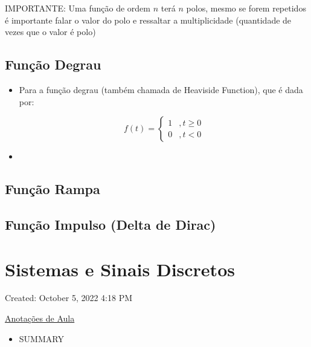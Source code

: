 \documentclass[]{article}
\providecommand{\tightlist}{%
  \setlength{\itemsep}{0pt}\setlength{\parskip}{0pt}}
\begin{document}
  IMPORTANTE: Uma função de ordem \(n\) terá \(n\) polos, mesmo se forem
  repetidos é importante falar o valor do polo e ressaltar a
  multiplicidade (quantidade de vezes que o valor é polo)

  \hypertarget{funuxe7uxe3o-degrau}{%
  \subsection{Função Degrau}\label{funuxe7uxe3o-degrau}}

  \begin{itemize}
  \item
    Para a função degrau (também chamada de Heaviside Function), que é
    dada por:

    \[
      f(t) = \begin{cases}
      1 & , t \ge 0 \\ 
      0 & , t < 0
      \end{cases}
      \]
  \item
  \end{itemize}

  \hypertarget{funuxe7uxe3o-rampa}{%
  \subsection{Função Rampa}\label{funuxe7uxe3o-rampa}}

  \hypertarget{funuxe7uxe3o-impulso-delta-de-dirac}{%
  \subsection{Função Impulso (Delta de
  Dirac)}\label{funuxe7uxe3o-impulso-delta-de-dirac}}

  \hypertarget{sistemas-e-sinais-discretos}{%
  \section{Sistemas e Sinais
  Discretos}\label{sistemas-e-sinais-discretos}}

  Created: October 5, 2022 4:18 PM

  \href{Sistemas\%20e\%20Sinais\%20Discretos\%20c31f42a2f7bb4ad2ab76f18a4d431de6/Anotac\%CC\%A7o\%CC\%83es\%20de\%20Aula\%20e5585af81899476781609c4216a9b8b4.md}{Anotações
  de Aula}

  \begin{itemize}
  \tightlist
  \item
    SUMMARY
  \end{itemize}
\end{document}
